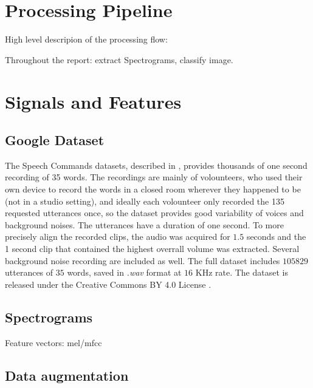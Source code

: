 
\section{Processing Pipeline}
\label{sec:processing_architecture}

High level descripion of the processing flow:

Throughout the report: extract Spectrograms, classify image.

\section{Signals and Features}
\label{sec:model}

\subsection{Google Dataset}


The Speech Commands datasets, described in \cite{warden2018speech}, provides thousands of one second recording of 35 words.
The recordings are mainly of volounteers, who used their own device to record the words in a closed room wherever they happened to be (not in a studio setting), and ideally each volounteer only recorded the 135 requested utterances once, so the dataset provides good variability of voices and background noises.
The utterances have a duration of one second.
To more precisely align the recorded clips, the audio was acquired for $1.5$ seconds and the 1 second clip that contained the highest overrall volume was extracted.
Several background noise recording are included as well.
The full dataset includes $105829$ utterances of $35$ words, saved in \textit{.wav} format at $16$ KHz rate.
The dataset is released under the Creative Commons BY 4.0 License \cite{ccby4}.


\subsection{Spectrograms}

Feature vectors: mel/mfcc

\subsection{Data augmentation}

